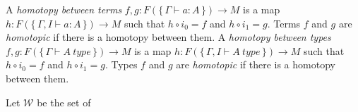 \documentclass[reqno]{amsart}
\theoremstyle{definition}
\theoremstyle{remark}
\newcommand{\we}{\mathcal{W}}
\numberwithin{figure}{section}
\begin{document}
A \emph{homotopy between terms} $f,g : F(\{\,\Gamma \vdash a : A\,\}) \to M$ is a map $h : F(\{\,\Gamma, I \vdash a : A\,\}) \to M$ such that $h \circ i_0 = f$ and $h \circ i_1 = g$.
Terms $f$ and $g$ are \emph{homotopic} if there is a homotopy between them.
A \emph{homotopy between types} $f,g : F(\{\,\Gamma \vdash A\ type\,\}) \to M$ is a map $h : F(\{\,\Gamma, I \vdash A\ type\,\}) \to M$ such that $h \circ i_0 = f$ and $h \circ i_1 = g$.
Types $f$ and $g$ are \emph{homotopic} if there is a homotopy between them.

Let $\we$ be the set of 



\end{document}
